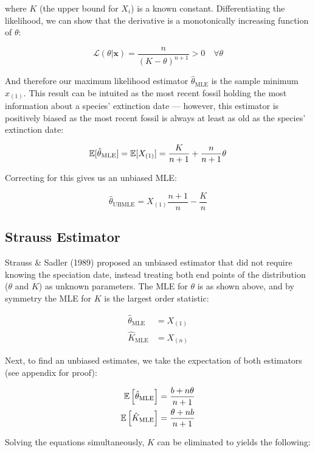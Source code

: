 where $K$ (the upper bound for $X_i$) is a known constant. Differentiating the likelihood, we can show that the derivative is a monotonically increasing function of $\theta$:

\[
\mathcal{L}(\theta | \bm{x}) =  \frac{n}{(K - \theta)^{n+1}} > 0 \quad \forall \theta
\]

And therefore our maximum likelihood estimator $\hat\theta_{\text{MLE}}$ is the sample minimum $x_{(1)}$. This result can be intuited as the most recent fossil holding the most information about a species' extinction date --- however, this estimator is positively biased as the most recent fossil is always at least as old as the species' extinction date:

\[
    \mathbb{E}[\hat\theta_{\text{MLE}}] = \mathbb{E}[X_{(1)}] = \frac{K}{n+1} + \frac{n}{n+1}\theta
\]

Correcting for this gives us an unbiased MLE:

\begin{equation}\label{eq:ubmle}
    \hat\theta_{\text{UBMLE}} = X_{(1)} \frac{n+1}{n} - \frac{K}{n}
\end{equation}

\subsection{Strauss Estimator}

Strauss \& Sadler (1989) \parencite{Strauss1989} proposed an unbiased estimator that did not require knowing the speciation date, instead treating both end points of the distribution ($\theta$ and $K$) as unknown parameters. The MLE for $\theta$ is as shown above, and by symmetry the MLE for $K$ is the largest order statistic:

\begin{align*}
    \hat\theta_{\text{MLE}} &= X_{(1)} \\
    \hat K_{\text{MLE}} &= X_{(n)}
\end{align*}

Next, to find an unbiased estimates, we take the expectation of both estimators (see appendix for proof):

\begin{align*}
    \mathbb{E} \left[ \hat\theta_{\text{MLE}} \right] &= \frac{b + n\theta}{n+1} \\
    \mathbb{E} \left[ \hat K_{\text{MLE}} \right]  &= \frac{\theta + nb}{n+1}
\end{align*}

Solving the equations simultaneously, $K$ can be eliminated to yields the following:


